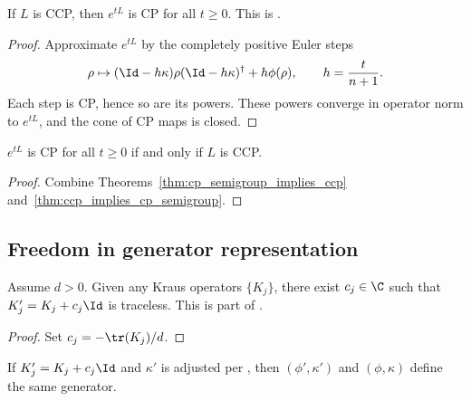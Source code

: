 \begin{theorem}
    \label{thm:ccp_implies_cp_semigroup}
    \leanok
    If $L$ is CCP, then $e^{tL}$ is CP for all $t \ge 0$.
    This is \cite[Proposition~7.3]{Wolf2012Quantum}.
\end{theorem}

\begin{proof}
    \leanok
    Approximate $e^{tL}$ by the completely positive Euler steps
    \[
        \rho \mapsto (\Id - h\kappa)\rho(\Id - h\kappa)^\dagger + h\phi(\rho),
        \qquad h = \frac{t}{n+1}.
    \]
    Each step is CP, hence so are its powers. These powers converge in operator
    norm to $e^{tL}$, and the cone of CP maps is closed.
\end{proof}

\begin{theorem}
    \label{thm:cp_semigroup_iff_ccp}
    \leanok
    $e^{tL}$ is CP for all $t \ge 0$ if and only if $L$ is CCP.
\end{theorem}

\begin{proof}
    \leanok
    Combine Theorems~\ref{thm:cp_semigroup_implies_ccp}
    and~\ref{thm:ccp_implies_cp_semigroup}.
\end{proof}

\subsection{Freedom in generator representation}

\begin{theorem}
    \label{thm:exists_traceless_kraus_shift}
    \leanok
    Assume $d > 0$. Given any Kraus operators $\{K_j\}$, there exist $c_j \in \C$
    such that $K_j' = K_j + c_j \Id$ is traceless.
    This is part of \cite[Proposition~7.4]{Wolf2012Quantum}.
\end{theorem}

\begin{proof}
    \leanok
    Set $c_j = -\tr(K_j)/d$.
\end{proof}

\begin{theorem}
    \label{thm:generator_shift_invariance}
    \leanok
    If $K_j' = K_j + c_j \Id$ and $\kappa'$ is adjusted per
    \cite[Equation~(7.19)]{Wolf2012Quantum},
    then $(\phi', \kappa')$ and $(\phi, \kappa)$ define the same generator.
\end{theorem}

